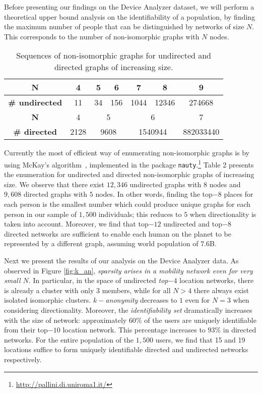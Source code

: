 Before presenting our findings on the Device Analyzer dataset, we will perform a theoretical upper bound analysis on the identifiability of a population, by finding the maximum number of people that can be distinguished by networks of size $ N $.
This corresponds to the number of non-isomorphic graphs with $ N $ nodes.


\begin{table}[!]
	\begin{center}
	\resizebox{0.7\textwidth}{!}
	{
	\label{sequences_of_nonisomorphic}
	\begin{tabular}{|c|c|c|c|c|c|c|}
		\hline
		\textbf{N}             & 4    & 5           & 6           & 7            & 8             & 9         \\ \hline
		\textbf{\# undirected} & 11   & 34          & 156         & 1044         & 12346         & 274668    \\ \hline
		\textbf{N}             & 4    & \multicolumn{2}{c|}{5}    & \multicolumn{2}{c|}{6}       & 7         \\ \hline
		\textbf{\# directed}   & 2128 & \multicolumn{2}{c|}{9608} & \multicolumn{2}{c|}{1540944} & 882033440 \\ \hline
	\end{tabular}
}
	\caption{{Sequences of non-isomorphic graphs for undirected and directed graphs of increasing size.}}
		\end{center}
\end{table}


Currently the most of efficient way of enumerating  non-isomorphic graphs is by using McKay's algorithm~\cite{McKay}, implemented in the package \texttt{nauty}.\footnote{\url{http://pallini.di.uniroma1.it/}}
Table 2 presents the enumeration for undirected and directed non-isomorphic graphs of increasing size.
We observe that there exist $12,346$ undirected graphs with $8$ nodes and $9,608$ directed graphs with $5$ nodes.
In other words, finding the top$-8$ places for each person is the smallest number which could produce unique graphs for each person in our sample of $1,500$ individuals; this reduces to $5$ when directionality is taken into account.
Moreover, we find that top$-12$ undirected and top$-8$ directed networks are sufficient to enable each human on the planet to be represented by a different graph, assuming world population of $7.6$B.

Next we present the results of our analysis on the Device Analyzer data.
As observed in Figure \ref{fig:k_an}, \emph{sparsity arises in a mobility network even for very small $ N $}.
In particular, in the space of undirected \emph{top$-4$} location networks, there is already a cluster with only $ 3 $ members, while for all $ N > 4 $ there always exist isolated isomorphic clusters.
\emph{$ k-$anonymity} decreases to $ 1 $ even for $ N=3 $ when considering directionality.
Moreover, the \emph{identifiability set} dramatically increases with the size of network: approximately $ 60\% $ of the users are uniquely identifiable from their top$-10$ location network.
This percentage increases to $93\%$ in directed networks.
For the entire population of the $ 1,500 $ users, we find that 15 and 19 locations suffice to form uniquely identifiable directed and undirected networks respectively.

